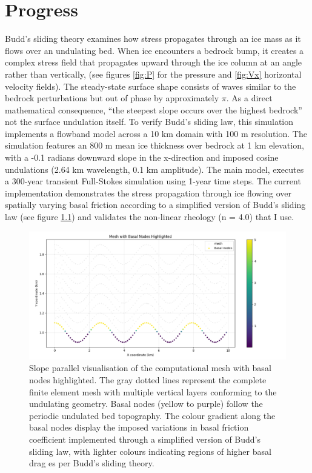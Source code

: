 \chapter{Progress}

Budd's sliding theory examines how stress propagates through an ice mass as it flows over an undulating bed. When ice encounters a bedrock bump, it creates a complex stress field that propagates upward through the ice column at an angle rather than vertically, (see figures \ref{fig:P} for the pressure and \ref{fig:Vx} horizontal velocity fields). The steady-state surface shape consists of waves similar to the bedrock perturbations but out of phase by approximately $\pi$. As a direct mathematical consequence, ``the steepest slope occurs over the highest bedrock''\cite{Budd_1970} not the surface undulation itself. To verify Budd's sliding law, this simulation implements a flowband model across a 10 km domain with 100 m resolution. The simulation features an 800 m mean ice thickness over bedrock at 1 km elevation, with a -0.1 radians downward slope in the x-direction and imposed cosine undulations (2.64 km wavelength, 0.1 km amplitude). The main model, executes a 300-year transient Full-Stokes simulation using 1-year time steps. The current implementation demonstrates the stress propagation through ice flowing over spatially varying basal friction according to a simplified version of Budd's sliding law (see figure \ref{fig:Friction}) and validates the non-linear rheology (n = 4.0) that I use.


\begin{figure}[H]
    \includegraphics[scale=0.5]{basal_friction.png}
    \caption{Slope parallel visualisation of the computational mesh with basal nodes highlighted. The gray dotted lines represent the complete finite element mesh with multiple vertical layers conforming to the undulating geometry. Basal nodes (yellow to purple) follow the periodic undulated bed topography. The colour gradient along the basal nodes display the imposed variations in basal friction coefficient implemented through a simplified version of Budd's sliding law, with lighter colours indicating regions of higher basal drag es per Budd's sliding theory.}
    \label{fig:Friction}
\end{figure}


